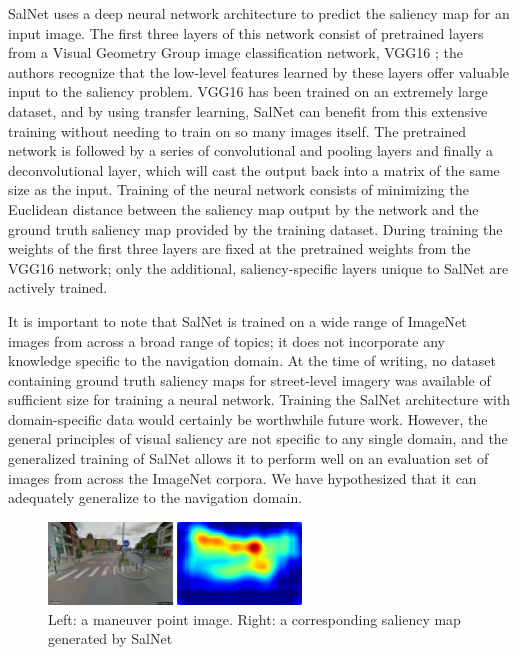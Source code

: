 SalNet uses a deep neural network architecture to predict the saliency map for an input image. The first three layers of this network consist of pretrained layers from a Visual Geometry Group image classification network, VGG16 \cite{Simonyan14c}; the authors recognize that the low-level features learned by these layers offer valuable input to the saliency problem. VGG16 has been trained on an extremely large dataset, and by using transfer learning, SalNet can benefit from this extensive training without needing to train on so many images itself. The pretrained network is followed by a series of convolutional and pooling layers and finally a deconvolutional layer, which will cast the output back into a matrix of the same size as the input. Training of the neural network consists of minimizing the Euclidean distance between the saliency map output by the network and the ground truth saliency map provided by the training dataset. During training the weights of the first three layers are fixed at the pretrained weights from the VGG16 network; only the additional, saliency-specific layers unique to SalNet are actively trained.

It is important to note that SalNet is trained on a wide range of ImageNet images from across a broad range of topics; it does not incorporate any knowledge specific to the navigation domain. At the time of writing, no dataset containing ground truth saliency maps for street-level imagery was available of sufficient size for training a neural network. Training the SalNet architecture with domain-specific data would certainly be worthwhile future work. However, the general principles of visual saliency are not specific to any single domain, and the generalized training of SalNet allows it to perform well on an evaluation set of images from across the ImageNet corpora. We have hypothesized that it can adequately generalize to the navigation domain.

\begin{figure}[htbp]
  \centering
  \includegraphics[width=0.6\textwidth]{images/saliencyMap.png}
  \caption{Left: a maneuver point image. Right: a corresponding saliency map generated by SalNet}
  \label{fig:saliencyMap}
\end{figure}

